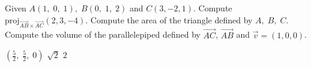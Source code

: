 
\begin{Exercise}[
name={},
title={}, 
difficulty=0,
origin={\cite{YL}}]
Given $A(1,\; 0,\; 1),\; B(0,\; 1,\; 2)$ and $C(3, -2, 1)$.
\Question Compute $\text{proj}_{\vec{AB}\times\vec{AC}} (2,3,-4)$.
\Question Compute the area of the triangle defined by $A,\; B,\; C$.
\Question Compute the volume of the parallelepiped defined by $\vec{AC}$, $\vec{AB}$ and $\vec{v}=(1,0,0)$.
\end{Exercise}

\begin{Answer}
\Question $\left(\frac{5}{2},\;\frac{5}{2},\;0\right)$
\Question $\sqrt{2}$
\Question $2$
\end{Answer}
